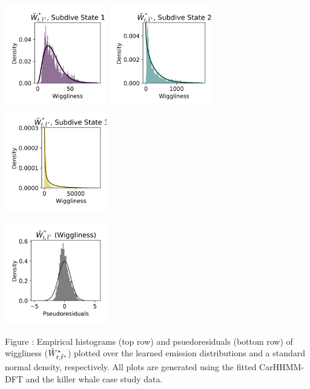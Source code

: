 \documentclass{article}
\begin{document}
        \begin{center}
        \includegraphics[width=1.75in]{../Plots/CarHHMM2_empirical_hist_ahat_0.png}
        \includegraphics[width=1.75in]{../Plots/CarHHMM2_empirical_hist_ahat_1.png}
        \includegraphics[width=1.75in]{../Plots/CarHHMM2_empirical_hist_ahat_2.png}
        
        \includegraphics[width=1.75in]{../Plots/CarHHMM2_psedoresids_ahat.png}
        \end{center}
        
        \noindent Figure : Empirical histograms (top row) and psuedoresiduals (bottom row) of wiggliness ($\tilde{W}^*_{t,\tilde t^*}$) plotted over the learned emission distributions and a standard normal density, respectively. All plots are generated using the fitted CarHHMM-DFT and the killer whale case study data.
        \addtocounter{fignum}{1}
        
\end{document}
